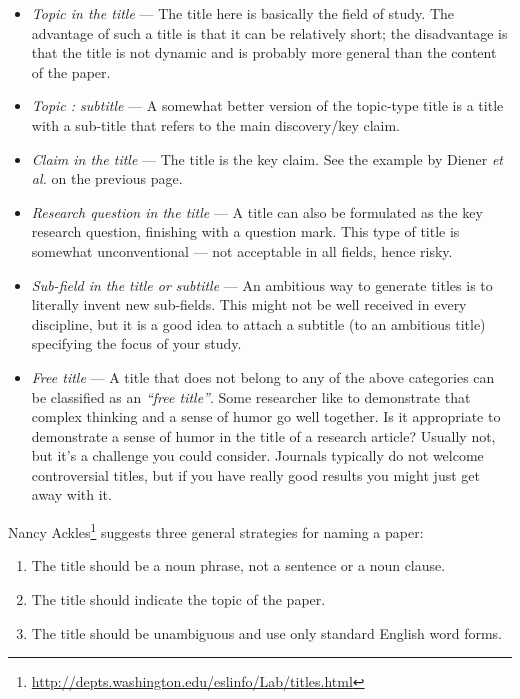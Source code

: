 \documentclass[graybox,envcountchap,sectrefs,UStrade]{svmono}
\begin{document}
\begin{itemize}
  \item \emph{Topic in the title} --- The title here is basically the field of study. The advantage of such a title is that it can be relatively short; the disadvantage is that the title is not dynamic and is probably more general than the content of the paper. \smallskip
  \item \emph{Topic : subtitle} --- A somewhat better version of the topic-type title is a title with a sub-title that refers to the main discovery/key claim. \smallskip
  \item \emph{Claim in the title} --- The title is the key claim. See the example by Diener \emph{et al.} on the previous page. \smallskip
  \item \emph{Research question in the title} --- A title can also be formulated as the key research question, finishing with a question mark. This type of title is somewhat unconventional --- not acceptable in all fields, hence risky. \smallskip
  \item \emph{Sub-field in the title or subtitle} --- An ambitious way to generate titles is to literally invent new sub-fields. This might not be well received in every discipline, but it is a good idea to attach a subtitle (to an ambitious title) specifying the focus of your study. \smallskip
  \item \emph{Free title} --- A title that does not belong to any of the above categories can be classified as an \emph{``free title''}. Some researcher like to demonstrate that complex thinking and a sense of humor go well together. Is it appropriate to demonstrate a sense of humor in the title of a research article? Usually not, but it's a challenge you could consider. Journals typically do not welcome controversial titles, but if you have really good results you might just get away with it.
\end{itemize}

Nancy Ackles\footnote{\url{http://depts.washington.edu/eslinfo/Lab/titles.html}} suggests three general strategies for naming a paper:

\begin{enumerate}
\renewcommand{\labelenumi}{\Roman{enumi}}
  \item The title should be a noun phrase, not a sentence or a noun clause.
  \item The title should indicate the topic of the paper.
  \item The title should be unambiguous and use only standard English word forms.
\end{enumerate}
\end{document}
